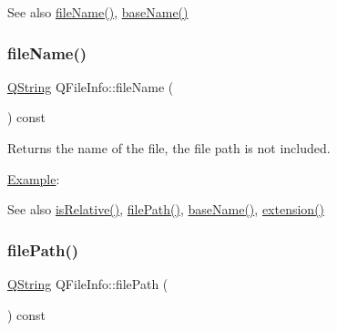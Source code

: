 \begin{DoxySeeAlso}{See also}
\mbox{\hyperlink{class_q_file_info_a4f6795e14c6dc89e4a54d7b5cad9d03f}{file\+Name()}}, \mbox{\hyperlink{class_q_file_info_a17e986f20da0f2f8239fb99c5b6ecd27}{base\+Name()}} 
\end{DoxySeeAlso}
\mbox{\label{class_q_file_info_a4f6795e14c6dc89e4a54d7b5cad9d03f}} 
\subsubsection{\texorpdfstring{fileName()}{fileName()}}
{\footnotesize\ttfamily \mbox{\hyperlink{class_q_string}{Q\+String}} Q\+File\+Info\+::file\+Name (\begin{DoxyParamCaption}{ }\end{DoxyParamCaption}) const}

Returns the name of the file, the file path is not included.

\mbox{\hyperlink{struct_example}{Example}}\+: 
\begin{DoxyCode}{0}
\end{DoxyCode}


\begin{DoxySeeAlso}{See also}
\mbox{\hyperlink{class_q_file_info_ae1b2d0ad6ca05510092d0182e276a5d0}{is\+Relative()}}, \mbox{\hyperlink{class_q_file_info_af3dc855c31853287a4f4a17a18d68bc2}{file\+Path()}}, \mbox{\hyperlink{class_q_file_info_a17e986f20da0f2f8239fb99c5b6ecd27}{base\+Name()}}, \mbox{\hyperlink{class_q_file_info_aea9896c7746e79f76b66b1bd71631520}{extension()}} 
\end{DoxySeeAlso}
\mbox{\label{class_q_file_info_af3dc855c31853287a4f4a17a18d68bc2}} 
\subsubsection{\texorpdfstring{filePath()}{filePath()}}
{\footnotesize\ttfamily \mbox{\hyperlink{class_q_string}{Q\+String}} Q\+File\+Info\+::file\+Path (\begin{DoxyParamCaption}{ }\end{DoxyParamCaption}) const}

